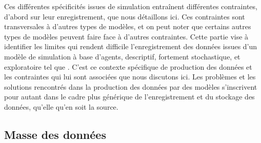 Ces différentes spécificités issues de simulation entraînent différentes contraintes, d'abord sur leur enregistrement, que nous détaillons ici.
Ces contraintes sont transversales à d'autres types de modèles, et on peut noter que certains autres types de modèles peuvent faire face à d'autres contraintes.
Cette partie vise à identifier les limites qui rendent difficile l'enregistrement des données issues d'un modèle de simulation à base d'agents, descriptif, fortement stochastique, et exploratoire tel que \simfeodal{}.
C'est ce contexte spécifique de production des données et les contraintes qui lui sont associées que nous discutons ici.
Les problèmes et les solutions rencontrés dans la production des données par des modèles s'inscrivent pour autant dans le cadre plus générique de l'enregistrement et du stockage des données, qu'elle qu'en soit la source.

\subsection{Masse des données}

